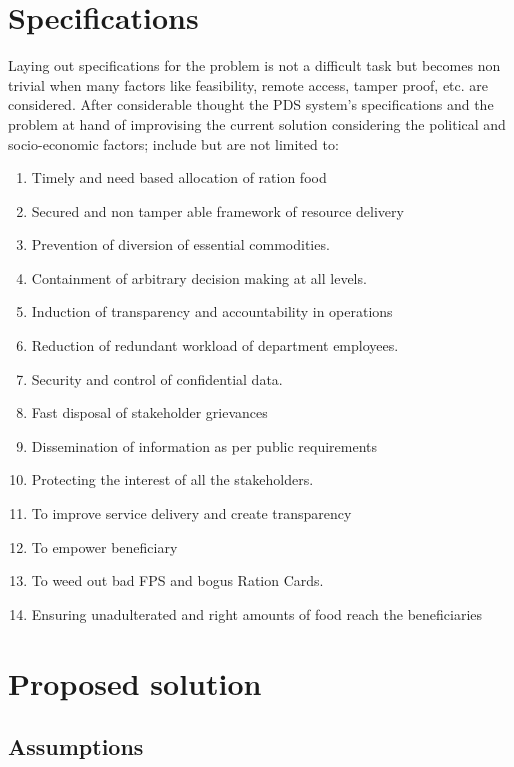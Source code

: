 \documentclass{article}
\begin{document}
\section{Specifications}

Laying out specifications for the problem is not a difficult task but becomes non trivial when many factors like feasibility, remote access, tamper proof, etc. are considered. After considerable thought the PDS system's specifications and the problem at hand of improvising the current solution considering the political and socio-economic factors; include but are not limited to:

\begin{enumerate}
\item Timely and need based allocation of ration food
\item Secured and non tamper able framework of resource delivery 
\item Prevention of diversion of essential commodities. 
\item Containment of arbitrary decision making at all levels. 
\item Induction of transparency and accountability in operations
\item Reduction of redundant workload of department employees. 
\item Security and control of confidential data. 
\item Fast disposal of stakeholder grievances
\item Dissemination of information as per public requirements
\item Protecting the interest of all the stakeholders. 
\item To improve service delivery and create transparency 
\item To empower beneficiary 
\item To weed out bad FPS and bogus Ration Cards. 
\item Ensuring unadulterated and right amounts of food reach the beneficiaries
\end{enumerate}

\section{Proposed solution}

\subsection{Assumptions}
\end{document}
